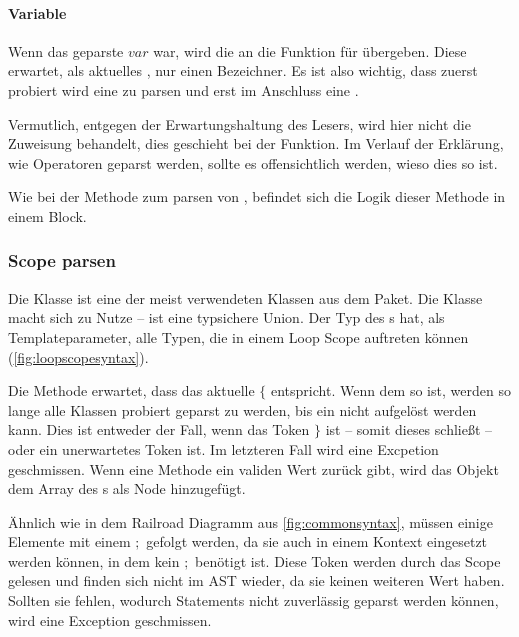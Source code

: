 {{      \paragraph{Variable}
        Wenn das geparste  \myRIn$var$ war, wird die  an die Funktion für  übergeben. Diese erwartet, als aktuelles , nur einen Bezeichner. Es ist also wichtig, dass zuerst probiert wird eine  zu parsen und erst im Anschluss eine .

        Vermutlich, entgegen der Erwartungshaltung des Lesers, wird hier nicht die Zuweisung behandelt, dies geschieht bei der  Funktion. Im Verlauf der Erklärung, wie Operatoren geparst werden, sollte es offensichtlich werden, wieso dies so ist.

        Wie bei der Methode zum parsen von , befindet sich die Logik dieser Methode in einem  Block.

    \subsubsection{Scope parsen}
    \label{sssec:Scope parsen}
      Die  Klasse ist eine der meist verwendeten Klassen aus dem  Paket. Die  Klasse macht sich  \autocite{cpp-variant} zu Nutze --  ist eine typsichere Union. Der  Typ des s hat, als Templateparameter, alle  Typen, die in einem Loop Scope auftreten können (\autoref{fig:loopscopesyntax}).

      Die  Methode erwartet, dass das aktuelle  \myRIn$\{$ entspricht. Wenn dem so ist, werden so lange alle  Klassen probiert geparst zu werden, bis ein  nicht aufgelöst werden kann. Dies ist entweder der Fall, wenn das Token \myRIn$\}$ ist -- somit dieses  schließt -- oder ein unerwartetes Token ist. Im letzteren Fall wird eine Excpetion geschmissen. Wenn eine Methode ein validen Wert zurück gibt, wird das Objekt dem Array des s als Node hinzugefügt.

      Ähnlich wie in dem Railroad Diagramm aus \autoref{fig:commonsyntax}, müssen einige  Elemente mit einem \myRIn$;$ gefolgt werden, da sie auch in einem Kontext eingesetzt werden können, in dem kein \myRIn$;$ benötigt ist. Diese Token werden durch das Scope gelesen und finden sich nicht im AST wieder, da sie keinen weiteren Wert haben. Sollten sie fehlen, wodurch Statements nicht zuverlässig geparst werden können, wird eine Exception geschmissen.

}}
